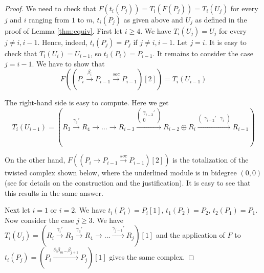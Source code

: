 \documentclass[12pt]{amsart}
\theoremstyle{plain}
\theoremstyle{remark}
\theoremstyle{definition}
\begin{document}
\begin{proof} We need to check that $F(t_i(P_j)) = T_i(F(P_j)) = T_i(U_j)$ for every $j$ and $i$ ranging from $1$ to $m$, $t_i(P_j)$ as given above and $U_j$ as defined in the proof of Lemma \ref{thm:equiv}. First let $i \geq 4$. We have $T_i(U_j) = U_j$ for every $j \neq i, i-1$. Hence, indeed, $t_i(P_j) = P_j$ if $j \neq i, i-1$. Let $j = i$. It is easy to check that $T_i(U_i) = U_{i-1}$, so $t_i(P_i) = P_{i-1}$. It remains to consider the case $j = i-1$. We have to show that $$F((P_i \xrightarrow{\beta_i} P_{i-1} \xrightarrow{soc} P_{i-1})[2]) = T_i(U_{i-1})$$

The right-hand side is easy to compute. Here we get $$T_i(U_{i-1}) = (R_3 \xrightarrow{\gamma_3'} R_4 \xrightarrow{} \dots \xrightarrow{} R_{i-3} \xrightarrow{\begin{pmatrix} \gamma_{i-3}' \\ 0 \end{pmatrix}} R_{i-2}\oplus R_i \xrightarrow{\begin{pmatrix}\gamma_{i-2}' & \gamma_i \end{pmatrix}} R_{i-1})$$ 

On the other hand, $F((P_i \xrightarrow{} P_{i-1} \xrightarrow{soc} P_{i-1})[2])$ is the totalization of the twisted complex shown below, where the underlined module is in bidegree $(0,0)$ (see \cite{R2} for details on the construction and the justification). It is easy to see that this results in the same answer.
\begin{center}
\end{center}

Next let $i=1$ or $i=2$. We have $t_i(P_i) = P_i[1]$, $t_1(P_2) = P_2$, $t_2(P_1) = P_1$. Now consider the case $j \geq 3$. We have ${T_i(U_j) = (R_i \xrightarrow{\gamma_i'} R_3 \xrightarrow{\gamma_3'} R_4 \xrightarrow{} \dots \xrightarrow{\gamma_{j-1}'} R_j)[1]}$ and the application of $F$ to ${t_i(P_j) = (P_i \xrightarrow{\delta_i\beta_m \dots \beta_{j+1}} P_j)[1]}$ gives the same complex. 


\end{proof}
\end{document}
